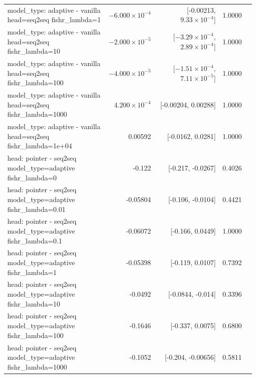 \documentclass[10pt]{article}
\makeatletter
\newcommand{\stackcell}[1]{\begin{tabular}[t]{@{}l@{}}#1\end{tabular}}
\makeatother
\begin{document}
{\begin{longtable}{lrrrl}
\stackcell{model\_type: adaptive - vanilla\\\footnotesize head=seq2seq fishr\_lambda=1 } & $-6.000\times10^{-4}$ & [-0.00213, $9.33\times10^{-4}$] & 1.0000 & \\
\stackcell{model\_type: adaptive - vanilla\\\footnotesize head=seq2seq fishr\_lambda=10 } & $-2.000\times10^{-5}$ & [$-3.29\times10^{-4}$, $2.89\times10^{-4}$] & 1.0000 & \\
\stackcell{model\_type: adaptive - vanilla\\\footnotesize head=seq2seq fishr\_lambda=100 } & $-4.000\times10^{-5}$ & [$-1.51\times10^{-4}$, $7.11\times10^{-5}$] & 1.0000 & \\
\stackcell{model\_type: adaptive - vanilla\\\footnotesize head=seq2seq fishr\_lambda=1000 } & $4.200\times10^{-4}$ & [-0.00204, 0.00288] & 1.0000 & \\
\stackcell{model\_type: adaptive - vanilla\\\footnotesize head=seq2seq fishr\_lambda=1e+04 } & 0.00592 & [-0.0162, 0.0281] & 1.0000 & \\
\stackcell{head: pointer - seq2seq\\\footnotesize model\_type=adaptive fishr\_lambda=0 } & -0.122 & [-0.217, -0.0267] & 0.4026 & \\
\stackcell{head: pointer - seq2seq\\\footnotesize model\_type=adaptive fishr\_lambda=0.01 } & -0.05804 & [-0.106, -0.0104] & 0.4421 & \\
\stackcell{head: pointer - seq2seq\\\footnotesize model\_type=adaptive fishr\_lambda=0.1 } & -0.06072 & [-0.166, 0.0449] & 1.0000 & \\
\stackcell{head: pointer - seq2seq\\\footnotesize model\_type=adaptive fishr\_lambda=1 } & -0.05398 & [-0.119, 0.0107] & 0.7392 & \\
\stackcell{head: pointer - seq2seq\\\footnotesize model\_type=adaptive fishr\_lambda=10 } & -0.0492 & [-0.0844, -0.014] & 0.3396 & \\
\stackcell{head: pointer - seq2seq\\\footnotesize model\_type=adaptive fishr\_lambda=100 } & -0.1646 & [-0.337, 0.0075] & 0.6800 & \\
\stackcell{head: pointer - seq2seq\\\footnotesize model\_type=adaptive fishr\_lambda=1000 } & -0.1052 & [-0.204, -0.00656] & 0.5811 & \\

\end{longtable}}
\end{document}
